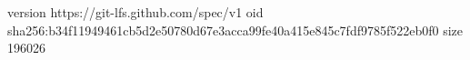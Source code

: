 version https://git-lfs.github.com/spec/v1
oid sha256:b34f11949461cb5d2e50780d67e3acca99fe40a415e845c7fdf9785f522eb0f0
size 196026
